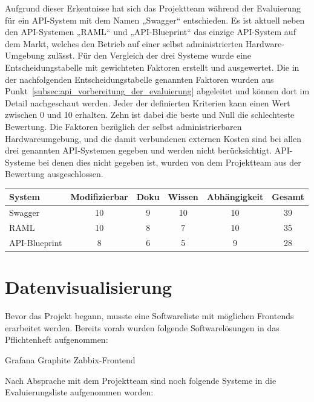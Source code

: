 Aufgrund dieser Erkentnisse hat sich das Projektteam während der Evaluierung
für ein API-System mit dem Namen „Swagger“ entschieden. Es ist aktuell neben den
API-Systemen „RAML“ und „API-Blueprint“ das einzige API-System auf dem Markt,
welches den Betrieb auf einer selbst administrierten Hardware-Umgebung zulässt.
Für den Vergleich der drei Systeme wurde eine Entscheidungstabelle mit
gewichteten Faktoren erstellt und ausgewertet. Die in der nachfolgenden
Entscheidungstabelle genannten Faktoren wurden aus
Punkt~\ref{subsec:api_vorbereitung_der_evaluierung} abgeleitet und können dort
im Detail nachgeschaut werden. Jeder der definierten Kriterien kann einen
Wert zwischen 0 und 10 erhalten. Zehn ist dabei die beste und Null die
schlechteste Bewertung. Die Faktoren bezüglich der selbst administrierbaren
Hardwareumgebung, und die damit verbundenen externen Kosten sind bei allen drei
genannten API-Systemen gegeben und werden nicht berücksichtigt. API-Systeme bei
denen dies nicht gegeben ist, wurden von dem Projektteam aus der Bewertung
ausgeschlossen.

\begin{center}
\begin{tabular}{lccccc}
  \toprule
  System & Modifizierbar & Doku & Wissen & Abhängigkeit & Gesamt \\
  \midrule
  Swagger       & 10 & 9  & 10 & 10 & 39 \\
  RAML          & 10 & 8  & 7  & 10 & 35 \\
  API-Blueprint & 8  & 6  & 5  & 9  & 28 \\
  \bottomrule
\end{tabular}
\end{center}
\nl%

\section{Datenvisualisierung}
\label{sec:datenvisualisierung}
Bevor das Projekt begann, musste eine Softwareliste mit möglichen Frontends
erarbeitet werden. Bereits vorab wurden folgende Softwarelösungen in das
Pflichtenheft aufgenommen:

\begin{outline}
  \1 Grafana
  \1 Graphite
  \1 Zabbix-Frontend
\end{outline}

Nach Absprache mit dem Projektteam sind noch folgende Systeme in die
Evaluierungsliste aufgenommen worden:

